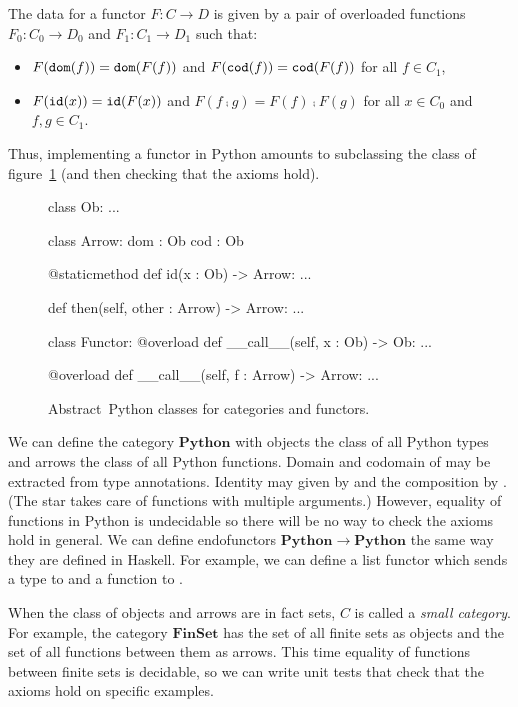 The data for a functor $F : C \to D$ is given by a pair of overloaded functions $F_0 : C_0 \to D_0$ and $F_1 : C_1 \to D_1$ such that:
\begin{itemize}
    \item $F(\mathtt{dom}(f)) = \mathtt{dom}(F(f))$ and $F(\mathtt{cod}(f)) = \mathtt{cod}(F(f))$ for all $f \in C_1$,
    \item $F(\mathtt{id}(x)) = \mathtt{id}(F(x))$ and $F(f \fcmp g) = F(f) \fcmp F(g)$ for all $x \in C_0$ and $f, g \in C_1$.
\end{itemize}
Thus, implementing a functor in Python amounts to subclassing the  class of figure~\ref{fig:abstract classes} (and then checking that the axioms hold).

\begin{figure}[h]
\caption{Abstract Python classes for categories and functors.}
\label{fig:abstract classes}
\begin{python}
class Ob:
    ...

class Arrow:
    dom : Ob
    cod : Ob

    @staticmethod
    def id(x : Ob) -> Arrow:
        ...

    def then(self, other : Arrow) -> Arrow:
        ...

class Functor:
    @overload
    def __call__(self, x : Ob) -> Ob:
        ...

    @overload
    def __call__(self, f : Arrow) -> Arrow:
        ...
\end{python}
\end{figure}

\begin{example}
We can define the category $\mathbf{Python}$ with objects the class of all Python types and arrows the class of all Python functions.
Domain and codomain of may be extracted from type annotations.
Identity may given by  and the composition by . (The star takes care of functions with multiple arguments.)
However, equality of functions in Python is undecidable so there will be no way to check the axioms hold in general.
We can define endofunctors $\mathbf{Python} \to \mathbf{Python}$ the same way they are defined in Haskell.
For example, we can define a list functor which sends a type  to  and a function  to .
\end{example}

\begin{example}
When the class of objects and arrows are in fact sets, $C$ is called a \emph{small category}.
For example, the category $\mathbf{FinSet}$ has the set of all finite sets as objects and the set of all functions between them as arrows.
This time equality of functions between finite sets is decidable, so we can write unit tests that check that the axioms hold on specific examples.
\end{example}

